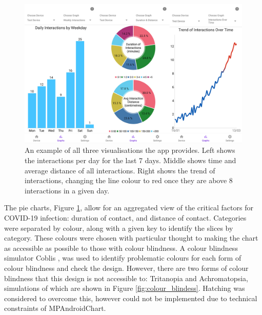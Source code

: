 \documentclass{l4proj}
\begin{document}
\begin{figure}[!htb]
    \centering
    \includegraphics[width=0.78\linewidth]{images/graphs.png}

    \caption{ An example of all three visualisations the app provides. Left shows the interactions per day for the last 7 days. Middle shows time and average distance of all interactions. Right shows the trend of interactions, changing the line colour to red once they are above 8 interactions in a given day. }

    \label{fig:app_visualisations}
\end{figure}

The pie charts, Figure \ref{fig:app_visualisations}, allow for an aggregated view of the critical factors for COVID-19 infection: duration of contact, and distance of contact. Categories were separated by colour, along with a given key to identify the slices by category. These colours were chosen with particular thought to making the chart as accessible as possible to those with colour blindness. A colour blindness simulator Coblis \citep{colblindor_coblis_2018}, was used to identify problematic colours for each form of colour blindness and check the design. However, there are two forms of colour blindness that this design is not accessible to: Tritanopia and Achromatopsia, simulations of which are shown in Figure \ref{fig:colour_blindess}. Hatching was considered to overcome this, however could not be implemented due to technical constraints of MPAndroidChart.
\end{document}
